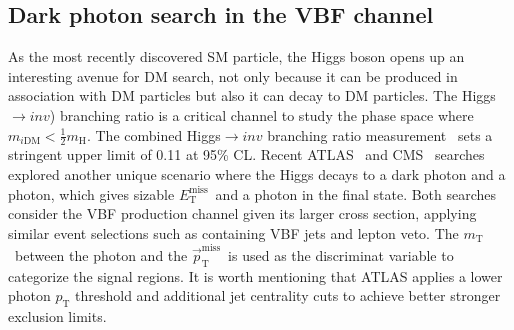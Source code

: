 \documentclass{moriond}
\def\mt{m_{\textrm{T}}}
\def\et{E_\textrm{T}^{\textrm{miss}}}
\def\ptmiss{\vec{p}_\textrm{T}^{\textrm{miss}}}
\begin{document}
\subsection{Dark photon search in the VBF channel}

As the most recently discovered SM particle, the Higgs boson opens up an
interesting avenue for DM search, not only because it can be produced in
association with DM particles but also it can decay to DM particles. The
Higgs$\rightarrow inv$) branching ratio is a critical channel to study the
phase space where $m_{i\textrm{DM}} < \frac{1}{2}m_{\textrm{H}}$. The combined
Higgs$\rightarrow inv$ branching ratio measurement~\cite{hiv} sets a stringent
upper limit of 0.11 at 95\% CL. Recent ATLAS~\cite{atlasvbf} and
CMS~\cite{cmsvbf} searches explored another unique scenario where the Higgs
decays to a dark photon and a photon, which gives sizable $\et$\ and a photon
in the final state. Both searches consider the VBF production channel given its
larger cross section, applying similar event selections such as containing VBF
jets and lepton veto. The $\mt$\ between the photon and the $\ptmiss$\ is used
as the discriminat variable to categorize the signal regions. It is worth
mentioning that ATLAS applies a lower photon $p_{\textrm{T}}$ threshold and
additional jet centrality cuts to achieve better stronger exclusion limits.  
\end{document}
